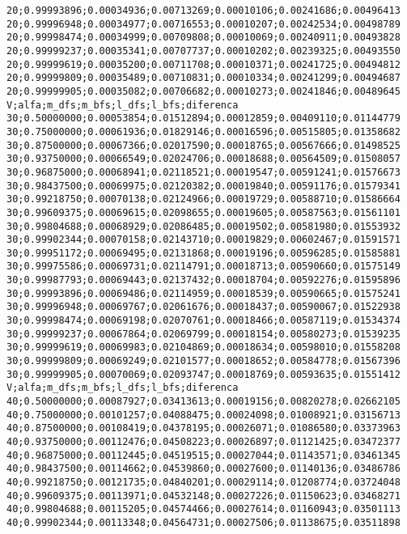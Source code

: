 \documentclass[brazil,times]{abnt}
\begin{document}
{\begin{verbatim}
20;0.99993896;0.00034936;0.00713269;0.00010106;0.00241686;0.00496413
20;0.99996948;0.00034977;0.00716553;0.00010207;0.00242534;0.00498789
20;0.99998474;0.00034999;0.00709808;0.00010069;0.00240911;0.00493828
20;0.99999237;0.00035341;0.00707737;0.00010202;0.00239325;0.00493550
20;0.99999619;0.00035200;0.00711708;0.00010371;0.00241725;0.00494812
20;0.99999809;0.00035489;0.00710831;0.00010334;0.00241299;0.00494687
20;0.99999905;0.00035082;0.00706682;0.00010273;0.00241846;0.00489645
V;alfa;m_dfs;m_bfs;l_dfs;l_bfs;diferenca
30;0.50000000;0.00053854;0.01512894;0.00012859;0.00409110;0.01144779
30;0.75000000;0.00061936;0.01829146;0.00016596;0.00515805;0.01358682
30;0.87500000;0.00067366;0.02017590;0.00018765;0.00567666;0.01498525
30;0.93750000;0.00066549;0.02024706;0.00018688;0.00564509;0.01508057
30;0.96875000;0.00068941;0.02118521;0.00019547;0.00591241;0.01576673
30;0.98437500;0.00069975;0.02120382;0.00019840;0.00591176;0.01579341
30;0.99218750;0.00070138;0.02124966;0.00019729;0.00588710;0.01586664
30;0.99609375;0.00069615;0.02098655;0.00019605;0.00587563;0.01561101
30;0.99804688;0.00068929;0.02086485;0.00019502;0.00581980;0.01553932
30;0.99902344;0.00070158;0.02143710;0.00019829;0.00602467;0.01591571
30;0.99951172;0.00069495;0.02131868;0.00019196;0.00596285;0.01585881
30;0.99975586;0.00069731;0.02114791;0.00018713;0.00590660;0.01575149
30;0.99987793;0.00069443;0.02137432;0.00018704;0.00592276;0.01595896
30;0.99993896;0.00069486;0.02114959;0.00018539;0.00590665;0.01575241
30;0.99996948;0.00069767;0.02061676;0.00018437;0.00590067;0.01522938
30;0.99998474;0.00069198;0.02070761;0.00018466;0.00587119;0.01534374
30;0.99999237;0.00067864;0.02069799;0.00018154;0.00580273;0.01539235
30;0.99999619;0.00069983;0.02104869;0.00018634;0.00598010;0.01558208
30;0.99999809;0.00069249;0.02101577;0.00018652;0.00584778;0.01567396
30;0.99999905;0.00070069;0.02093747;0.00018769;0.00593635;0.01551412
V;alfa;m_dfs;m_bfs;l_dfs;l_bfs;diferenca
40;0.50000000;0.00087927;0.03413613;0.00019156;0.00820278;0.02662105
40;0.75000000;0.00101257;0.04088475;0.00024098;0.01008921;0.03156713
40;0.87500000;0.00108419;0.04378195;0.00026071;0.01086580;0.03373963
40;0.93750000;0.00112476;0.04508223;0.00026897;0.01121425;0.03472377
40;0.96875000;0.00112445;0.04519515;0.00027044;0.01143571;0.03461345
40;0.98437500;0.00114662;0.04539860;0.00027600;0.01140136;0.03486786
40;0.99218750;0.00121735;0.04840201;0.00029114;0.01208774;0.03724048
40;0.99609375;0.00113971;0.04532148;0.00027226;0.01150623;0.03468271
40;0.99804688;0.00115205;0.04574466;0.00027614;0.01160943;0.03501113
40;0.99902344;0.00113348;0.04564731;0.00027506;0.01138675;0.03511898

\end{verbatim}}
\end{document}

